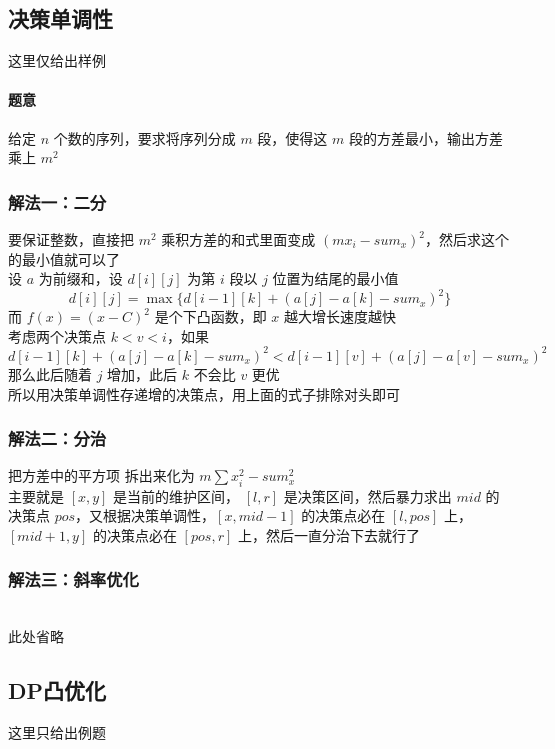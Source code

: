 	\subsection{决策单调性}
	这里仅给出样例
	\vspace{0.5cm}
	\paragraph{题意}给定 $n$ 个数的序列，要求将序列分成 $m$ 段，使得这 $m$ 段的方差最小，输出方差乘上 $m^2$
	\subsubsection{解法一：二分}
	要保证整数，直接把 $m^2$ 乘积方差的和式里面变成 $(mx_i-sum_x)^2$，然后求这个的最小值就可以了\\
	设 $a$ 为前缀和，设 $d[i][j]$ 为第 $i$ 段以 $j$ 位置为结尾的最小值\\
	$$
	d[i][j]=\max\{d[i-1][k]+(a[j]-a[k]-sum_x)^2\}
	$$
	而 $f(x)=(x-C)^2$ 是个下凸函数，即 $x$ 越大增长速度越快\\
	考虑两个决策点 $k<v<i$，如果\\
	$$
	d[i-1][k]+(a[j]-a[k]-sum_x)^2<d[i-1][v]+(a[j]-a[v]-sum_x)^2
	$$
	那么此后随着 $j$ 增加，此后 $k$ 不会比 $v$ 更优\\
	所以用决策单调性存递增的决策点，用上面的式子排除对头即可\\
	
	\newpage
	\subsubsection{解法二：分治}把方差中的平方项
	拆出来化为 $m\sum x_i^2-sum_x^2$\\
	主要就是 $[x,y]$ 是当前的维护区间， $[l,r]$ 是决策区间，然后暴力求出 $mid$ 的决策点 $pos$，又根据决策单调性，$[x,mid-1]$ 的决策点必在 $[l,pos]$ 上，$[mid+1,y]$ 的决策点必在 $[pos,r]$ 上，然后一直分治下去就行了\\
	
	\vspace{0.5cm}
	\subsubsection{解法三：斜率优化}~\\此处省略
	\newpage
	\subsection{DP凸优化}
	\vspace{0.5cm}
	这里只给出例题\\
